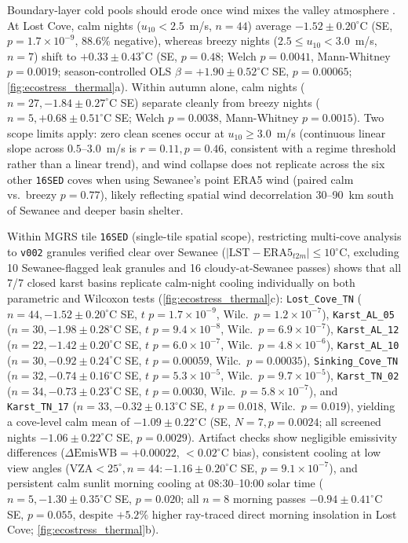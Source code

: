Boundary-layer cold pools should erode once wind mixes the valley atmosphere \citep{whiteman1982}. At Lost Cove, calm nights ($u_{10}<2.5$~m/s, $n=44$) average $-1.52 \pm 0.20^\circ$C (SE, $p=1.7 \times 10^{-9}$, 88.6\% negative), whereas breezy nights ($2.5 \le u_{10} < 3.0$~m/s, $n=7$) shift to $+0.33 \pm 0.43^\circ$C (SE, $p=0.48$; Welch $p=0.0041$, Mann-Whitney $p=0.0019$; season-controlled OLS $\beta=+1.90 \pm 0.52^\circ$C SE, $p=0.00065$; \cref{fig:ecostress_thermal}a). Within autumn alone, calm nights ($n=27, -1.84 \pm 0.27^\circ$C SE) separate cleanly from breezy nights ($n=5, +0.68 \pm 0.51^\circ$C SE; Welch $p=0.0038$, Mann-Whitney $p=0.0015$). Two scope limits apply: zero clean scenes occur at $u_{10} \ge 3.0$~m/s (continuous linear slope across $0.5$--$3.0$~m/s is $r=0.11, p=0.46$, consistent with a regime threshold rather than a linear trend), and wind collapse does not replicate across the six other \texttt{16SED} coves when using Sewanee's point ERA5 wind (paired calm vs.\ breezy $p=0.77$), likely reflecting spatial wind decorrelation 30--90~km south of Sewanee and deeper basin shelter.

Within MGRS tile \texttt{16SED} (single-tile spatial scope), restricting multi-cove analysis to \texttt{v002} granules verified clear over Sewanee ($|\text{LST}-\text{ERA5}_{t2m}| \le 10^\circ$C, excluding 10 Sewanee-flagged leak granules and 16 cloudy-at-Sewanee passes) shows that all 7/7 closed karst basins replicate calm-night cooling individually on both parametric and Wilcoxon tests (\cref{fig:ecostress_thermal}c): \texttt{Lost\_\allowbreak Cove\_TN} ($n=44, -1.52 \pm 0.20^\circ$C SE, $t$ $p=1.7 \times 10^{-9}$, Wilc.\ $p=1.2 \times 10^{-7}$), \texttt{Karst\_\allowbreak AL\_05} ($n=30, -1.98 \pm 0.28^\circ$C SE, $t$ $p=9.4 \times 10^{-8}$, Wilc.\ $p=6.9 \times 10^{-7}$), \texttt{Karst\_\allowbreak AL\_12} ($n=22, -1.42 \pm 0.20^\circ$C SE, $t$ $p=6.0 \times 10^{-7}$, Wilc.\ $p=4.8 \times 10^{-6}$), \texttt{Karst\_\allowbreak AL\_10} ($n=30, -0.92 \pm 0.24^\circ$C SE, $t$ $p=0.00059$, Wilc.\ $p=0.00035$), \texttt{Sinking\_\allowbreak Cove\_TN} ($n=32, -0.74 \pm 0.16^\circ$C SE, $t$ $p=5.3 \times 10^{-5}$, Wilc.\ $p=9.7 \times 10^{-5}$), \texttt{Karst\_\allowbreak TN\_02} ($n=34, -0.73 \pm 0.23^\circ$C SE, $t$ $p=0.0030$, Wilc.\ $p=5.8 \times 10^{-7}$), and \texttt{Karst\_\allowbreak TN\_17} ($n=33, -0.32 \pm 0.13^\circ$C SE, $t$ $p=0.018$, Wilc.\ $p=0.019$), yielding a cove-level calm mean of $-1.09 \pm 0.22^\circ$C (SE, $N=7, p=0.0024$; all screened nights $-1.06 \pm 0.22^\circ$C SE, $p=0.0029$). Artifact checks show negligible emissivity differences ($\Delta\text{EmisWB}=+0.00022$, $<0.02^\circ$C bias), consistent cooling at low view angles ($\text{VZA}<25^\circ, n=44: -1.16 \pm 0.20^\circ$C SE, $p=9.1 \times 10^{-7}$), and persistent calm sunlit morning cooling at 08:30--10:00 solar time ($n=5, -1.30 \pm 0.35^\circ$C SE, $p=0.020$; all $n=8$ morning passes $-0.94 \pm 0.41^\circ$C SE, $p=0.055$, despite $+5.2\%$ higher ray-traced direct morning insolation in Lost Cove; \cref{fig:ecostress_thermal}b).


